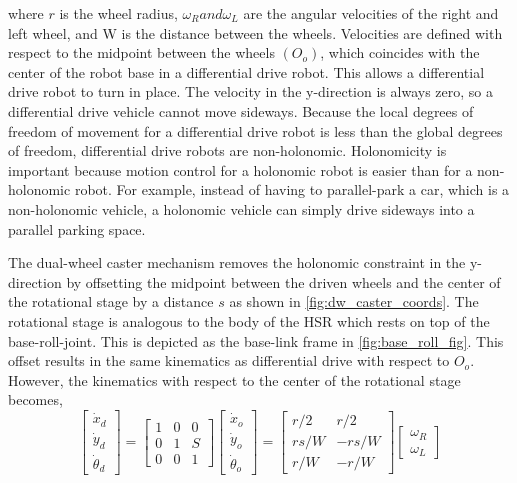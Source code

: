 \documentclass[12pt]{article}
\begin{document}
            where $r$ is the wheel radius, $\omega_{R} and \omega_{L}$ are the angular velocities of the right and left wheel, and W is the distance between the wheels. Velocities are defined with respect to the midpoint between the wheels $(O_o)$, which coincides with the center of the robot base in a differential drive robot. This allows a differential drive robot to turn in place. The velocity in the y-direction is always zero, so a differential drive vehicle cannot move sideways. Because the local degrees of freedom of movement for a differential drive robot is less than the global degrees of freedom, differential drive robots are non-holonomic. Holonomicity is important because motion control for a holonomic robot is easier than for a non-holonomic robot.\cite{newman_c18_2017} For example, instead of having to parallel-park a car, which is a non-holonomic vehicle, a holonomic vehicle can simply drive sideways into a parallel parking space.

            \par The dual-wheel caster mechanism removes the holonomic constraint in the y-direction by offsetting the midpoint between the driven wheels and the center of the rotational stage by a distance $s$ as shown in \cref{fig:dw_caster_coords}. The rotational stage is analogous to the body of the HSR which rests on top of the base-roll-joint. This is depicted as the base-link frame in \cref{fig:base_roll_fig}. This offset results in the same kinematics as differential drive with respect to $O_{o}$. However, the kinematics with respect to the center of the rotational stage becomes,
            \begin{equation}
                \begin{bmatrix}
                    \dot{x}_{d}\\
                    \dot{y}_{d}\\
                    \dot{\theta}_{d}
                \end{bmatrix}
                =
                \begin{bmatrix}
                    1 & 0 & 0\\
                    0 & 1 & S\\
                    0 & 0 & 1
                \end{bmatrix}
                \begin{bmatrix}
                    \dot{x}_{o}\\
                    \dot{y}_{o}\\
                    \dot{\theta}_{o}
                \end{bmatrix}
                =
                \begin{bmatrix}
                    r/2 & r/2\\
                    rs/W & -rs/W\\
                    r/W & -r/W
                \end{bmatrix}
                \begin{bmatrix}
                    \omega_{R}\\
                    \omega_{L}
                \end{bmatrix}
            \end{equation}
\end{document}
